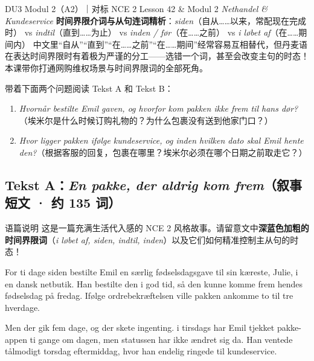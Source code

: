{DU3 Modul 2（A2）｜对标 NCE 2 Lesson 42 \& Modul 2 \textit{Nethandel \& Kundeservice}}
{\textbf{时间界限介词与从句连词精析}：\textit{siden}（自从……以来，常配现在完成时） vs \textit{indtil}（直到……为止） vs \textit{inden / før}（在……之前） vs \textit{i løbet af}（在……期间内）}
{中文里“自从”“直到”“在……之前”“在……期间”经常容易互相替代，但丹麦语在表达时间界限时有着极为严谨的分工——选错一个词，甚至会改变主句的时态！本课带你打通网购维权场景与时间界限词的全部死角。}

\begin{foerduleaeser}
带着下面两个问题阅读 Tekst A 和 Tekst B：
\begin{enumerate}
  \item \textit{Hvornår bestilte Emil gaven, og hvorfor kom pakken ikke frem til hans dør?}（埃米尔是什么时候订购礼物的？为什么包裹没有送到他家门口？）
  \item \textit{Hvor ligger pakken ifølge kundeservice, og inden hvilken dato skal Emil hente den?}（根据客服的回复，包裹在哪里？埃米尔必须在哪个日期之前取走它？）
\end{enumerate}
\end{foerduleaeser}


\subsection*{Tekst A：\textit{En pakke, der aldrig kom frem}（叙事短文 · 约 135 词）}

\begin{tipbox}{语篇说明}
这是一篇充满生活代入感的 NCE 2 风格故事。请留意文中\textbf{\color{NCDNavy}深蓝色加粗的时间界限词}（\textit{i løbet af, siden, indtil, inden}）以及它们如何精准控制主从句的时态！
\end{tipbox}

For ti dage siden bestilte Emil en særlig fødselsdagsgave til sin kæreste, Julie, i en dansk netbutik. Han bestilte den i god tid, så den kunne komme frem  hendes fødselsdag på fredag. Ifølge ordrebekræftelsen ville pakken ankomme  to til tre hverdage.

Men der gik fem dage, og der skete ingenting.  i tirsdags har Emil tjekket pakke-appen ti gange om dagen, men statussen har ikke ændret sig  da. Han ventede tålmodigt  torsdag eftermiddag, hvor han endelig ringede til kundeservice.

